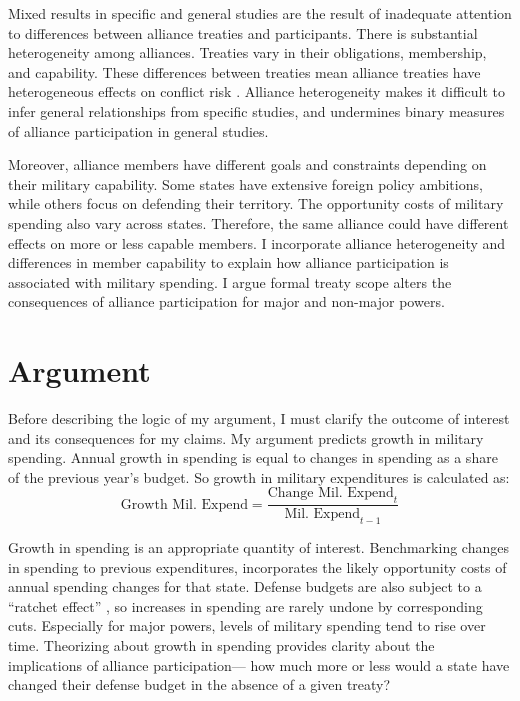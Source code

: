 \documentclass[12pt]{article}
\begin{document}
Mixed results in specific and general studies are the result of inadequate attention to differences between alliance treaties and participants.
There is substantial heterogeneity among alliances.
Treaties vary in their obligations, membership, and capability. 
These differences between treaties mean alliance treaties have heterogeneous effects on conflict risk \citep{Leeds2003, Benson2012}. 
Alliance heterogeneity makes it difficult to infer general relationships from specific studies, and undermines binary measures of alliance participation in general studies. 
 

Moreover, alliance members have different goals and constraints depending on their military capability.
Some states have extensive foreign policy ambitions, while others focus on defending their territory. 
The opportunity costs of military spending also vary across states. 
Therefore, the same alliance could have different effects on more or less capable members. 
I incorporate alliance heterogeneity and differences in member capability to explain how alliance participation is associated with military spending. 
I argue formal treaty scope alters the consequences of alliance participation for major and non-major powers. 



\section{Argument}

Before describing the logic of my argument, I must clarify the outcome of interest and its consequences for my claims. 
My argument predicts growth in military spending. 
Annual growth in spending is equal to changes in spending as a share of the previous year's budget. 
So growth in military expenditures is calculated as:
\begin{equation}
\mbox{Growth Mil. Expend} = \frac{ \mbox{Change Mil. Expend}_t }{ \mbox{Mil. Expend}_{t-1} }
\end{equation} 


Growth in spending is an appropriate quantity of interest. 
Benchmarking changes in spending to previous expenditures, incorporates the likely opportunity costs of annual spending changes for that state. 
Defense budgets are also subject to a ``ratchet effect'' \cite{Zielinskietal2017}, so increases in spending are rarely undone by corresponding cuts.
Especially for major powers, levels of military spending tend to rise over time. 
Theorizing about growth in spending provides clarity about the implications of alliance participation--- how much more or less would a state have changed their defense budget in the absence of a given treaty? 
\end{document}
